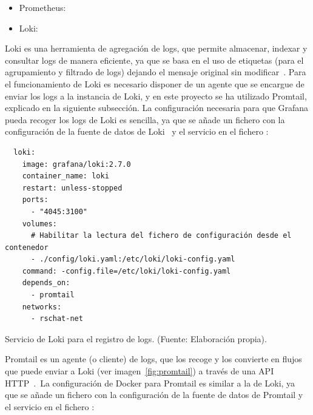 \begin{itemize}
	\item Prometheus: 
	\item Loki: 
\end{itemize}
\label{itm:grafana-data-sources}

Loki es una herramienta de agregación de logs, que permite almacenar, indexar y consultar logs de manera eficiente, ya
que se basa en el uso de etiquetas (para el agrupamiento y filtrado de logs) dejando el mensaje original sin
modificar~\cite{loki-docs}.
Para el funcionamiento de Loki es necesario disponer de un agente que se encargue de enviar los logs a la instancia de
Loki, y en este proyecto se ha utilizado Promtail, explicado en la siguiente subsección.
La configuración necesaria para que Grafana pueda recoger los logs de Loki es sencilla, ya que se añade un fichero
 con la configuración de la fuente de datos de Loki~\cite{loki-config-file} y el servicio en el
fichero :

\begin{codeBlock}
	\begin{verbatim}
  loki:
    image: grafana/loki:2.7.0
    container_name: loki
    restart: unless-stopped
    ports:
      - "4045:3100"
    volumes:
      # Habilitar la lectura del fichero de configuración desde el contenedor
      - ./config/loki.yaml:/etc/loki/loki-config.yaml
    command: -config.file=/etc/loki/loki-config.yaml
    depends_on:
      - promtail
    networks:
      - rschat-net
	\end{verbatim}
	\caption{Servicio de Loki para el registro de logs. (Fuente: Elaboración propia).}
	\label{cod:loki-docker-compose}
\end{codeBlock}

Promtail es un agente (o cliente) de logs, que los recoge y los convierte en flujos que puede enviar a Loki (ver
imagen~\ref{fig:promtail}) a través de una API HTTP~\cite{loki-docs}.\ La configuración de Docker para Promtail es
similar a la de
Loki, ya que se añade un fichero  con la configuración de la fuente de datos de Promtail y el servicio
en el fichero :

